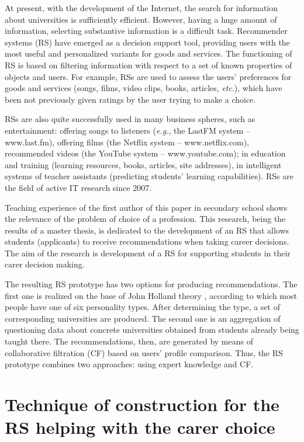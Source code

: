 \documentclass[conference,a4]{IEEEtran}
\begin{document}
At present, with the development of the Internet, the search for information about universities is sufficiently efficient. However, having a huge amount of information, selecting substantive information is a difficult task.  Recommender systems (RS) have emerged as a decision support tool, providing users with the most useful and personalized variants for goods and services.  The functioning of RS is based on filtering information with respect to a set of known properties of objects and users.  For example, RSs are used to assess the users' preferences for goods and services (songs, films, video clips, books, articles, \emph{etc}.), which have been not previously given ratings by the user trying to make a choice.

RSs are also quite successfully used in many business spheres, such as entertainment: offering songs to listeners (\emph{e.g.}, the LastFM system -- www.last.fm), offering films (the Netflix system -- www.netflix.com), recommended videos (the YouTube system -- www.youtube.com); in education and training (learning resources, books, articles, site addresses), in intelligent systems of teacher assistants (predicting students' learning capabilities).  RSs are the field of active IT research since 2007.

Teaching experience of the first author of this paper in secondary school shows the relevance of the problem of choice of a profession.  This research, being the results of a master thesis, is dedicated to the development of an RS that allows students (applicants) to receive recommendations when taking career decisions.  The aim of the research is development of a RS for supporting students in their carer decision making.

The resulting RS prototype has two options for producing recommendations. The first one is realized on the base of John Holland theory \cite{holland}, according to which most people have one of six personality types.  After determining the type, a set of corresponding universities are produced.  The second one is an aggregation of questioning data about concrete universities obtained from students already being taught there.  The recommendations, then, are generated by means of collaborative filtration (CF) based on users' profile comparison.  Thus, the RS prototype combines two approaches: using expert knowledge and CF.

\section{Technique of construction for the RS helping with the carer choice}
\label{sec:base}
\end{document}
